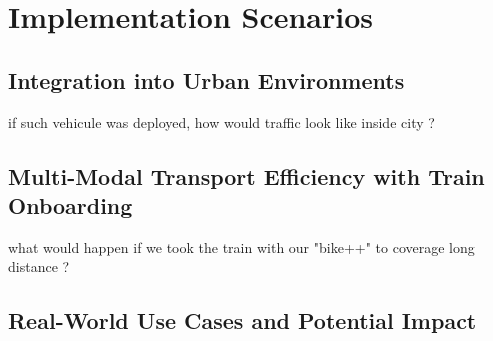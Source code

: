 \section{Implementation Scenarios}

\subsection{Integration into Urban Environments}
if such vehicule was deployed, how would traffic look like inside city ? 

\subsection{Multi-Modal Transport Efficiency with Train Onboarding}
what would happen if we took the train with our "bike++" to coverage long distance ?

\subsection{Real-World Use Cases and Potential Impact}